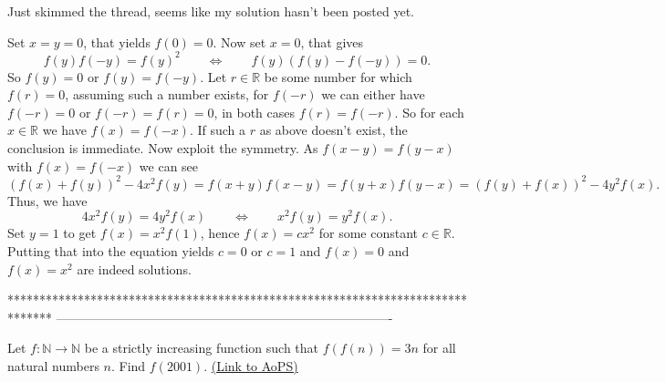 \begin{solution}
	Just skimmed the thread, seems like my solution hasn't been posted yet.

Set $x=y=0$, that yields $f(0)=0$. Now set $x=0$, that gives \[ f(y) f(-y) = f(y)^2 \qquad \iff \qquad f(y) \left(f(y)-f(-y) \right) = 0. \] So $f(y)=0$ or $f(y)=f(-y)$. Let $r \in \mathbb{R}$ be some number for which $f(r)=0$, assuming such a number exists, for $f(-r)$ we can either have $f(-r)=0$ or $f(-r)=f(r)=0$, in both cases $f(r)=f(-r)$. So for each $x \in \mathbb{R}$ we have $f(x)=f(-x)$. If such a $r$ as above doesn't exist, the conclusion is immediate.
Now exploit the symmetry. As $f(x-y)=f(y-x)$ with $f(x)=f(-x)$ we can see \[ \left(f(x)+f(y) \right)^2-4x^2f(y) = f(x+y)f(x-y)=f(y+x)f(y-x) = \left(f(y)+f(x) \right)^2 - 4y^2f(x). \] Thus, we have \[ 4x^2f(y) = 4y^2f(x) \qquad \iff \qquad x^2f(y) = y^2f(x). \] Set $y=1$ to get $f(x) = x^2 f(1)$, hence $f(x)=cx^2$ for some constant $c \in \mathbb{R}$. Putting that into the equation yields $c=0$ or $c=1$ and $f(x)=0$ and $f(x)=x^2$ are indeed solutions.
\end{solution}
*******************************************************************************
-------------------------------------------------------------------------------

\begin{problem}
	Let $f: \mathbb{N} \to \mathbb{N}$ be a strictly increasing function such that $f(f(n))=3n$ for all natural numbers $n$. Find $f(2001)$.
	\flushright \href{https://artofproblemsolving.com/community/c6h390679}{(Link to AoPS)}
\end{problem}



